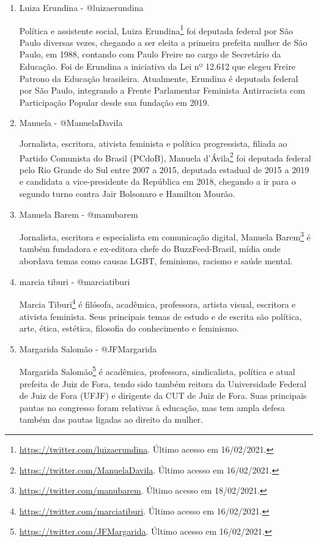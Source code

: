 \documentclass[
	12pt,				%
	openright,			%
	twoside,			%
	a4paper,			%
	english,			%
	brazil				%
	]{abntex2}
\begin{document}
\begin{anexosenv}
\begin{enumerate}
 \item Luiza Erundina - @luizaerundina
 
 Política e assistente social, Luiza Erundina\footnote{\url{https://twitter.com/luizaerundina}. Último acesso em 16/02/2021.} foi deputada federal por São Paulo diversas vezes, chegando a ser eleita a primeira prefeita mulher de São Paulo, em 1988, contando com Paulo Freire no cargo de Secretário da Educação. Foi de Erundina a iniciativa da Lei nº 12.612 que elegeu Freire Patrono da Educação brasileira. Atualmente, Erundina é deputada federal por São Paulo, integrando a Frente Parlamentar Feminista Antirracista com Participação Popular desde sua fundação em 2019.

 \item Manuela - @ManuelaDavila
 
 Jornalista, escritora, ativista feminista e política progressista, filiada ao Partido Comunista do Brasil (PCdoB), Manuela d'Ávila\footnote{\url{https://twitter.com/ManuelaDavila}. Último acesso em 16/02/2021.} foi deputada federal pelo Rio Grande do Sul entre 2007 a 2015, deputada estadual de 2015 a 2019 e candidata a vice-presidente da República em 2018, chegando a ir para o segundo turno contra Jair Bolsonaro e Hamilton Mourão.

 \item Manuela Barem - @manubarem
 
 Jornalista, escritora e especialista em comunicação digital, Manuela Barem\footnote{\url{https://twitter.com/manubarem}. Último acesso em 18/02/2021.} é também fundadora e ex-editora chefe do BuzzFeed-Brasil, mídia onde abordava temas como causas LGBT, feminismo, racismo e saúde mental.

 \item marcia tiburi - @marciatiburi
 
 Marcia Tiburi\footnote{\url{https://twitter.com/marciatiburi}. Último acesso em 16/02/2021.} é filósofa, acadêmica, professora, artista visual, escritora e ativista feminista. Seus principais temas de estudo e de escrita são política, arte, ética, estética, filosofia do conhecimento e feminismo.

 \item Margarida Salomão - @JFMargarida
 
 Margarida Salomão\footnote{\url{https://twitter.com/JFMargarida}. Último acesso em 16/02/2021.} é acadêmica, professora, sindicalista, política e atual prefeita de Juiz de Fora, tendo sido também reitora da Universidade Federal de Juiz de Fora (UFJF) e dirigente da CUT de Juiz de Fora. Suas principais pautas no congresso foram relativas à educação, mas tem ampla defesa também das pautas ligadas ao direito da mulher.


\end{enumerate}
\end{anexosenv}
\end{document}
